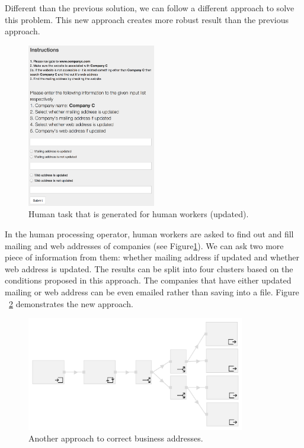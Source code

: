 

Different than the previous solution, we can follow a different approach to solve this problem. This new approach creates more robust result than the previous approach.

\begin{figure}[ht]
	\centering
	\includegraphics[width=0.5\textwidth]{figures/scenarios/scenario1_2h.png}
	\caption{Human task that is generated for human workers (updated).}
	\label{fig:scenario1.2h}
\end{figure}

In the human processing operator, human workers are asked to find out and fill mailing and web addresses of companies (see Figure\ref{fig:scenario1.2h}). We can ask two more piece of information from them: whether mailing address if updated and whether web address is updated. The results can be split into four clusters based on the conditions proposed in this approach. The companies that have either updated mailing or web address can be even emailed rather than saving into a file. Figure ~\ref{fig:scenario1.2} demonstrates the new approach.

\begin{figure}[ht]
	\centering
	\includegraphics[width=0.85\textwidth]{figures/scenarios/scenario1_2.png}
	\caption{Another approach to correct business addresses.}
	\label{fig:scenario1.2}
\end{figure}


